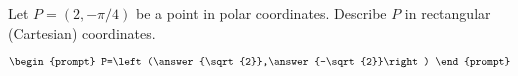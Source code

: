 \documentclass{ximera}
\author{Gregory Hartman \and Matthew Carr}
\begin{document}
\begin{exercise}





Let $P=(2,-\pi/4)$ be a point in polar coordinates. Describe $P$ in rectangular (Cartesian) coordinates.

\[
\begin{prompt}
P=\left(\answer{\sqrt{2}},\answer{-\sqrt{2}}\right)
\end{prompt}
\]

\end{exercise}
\end{document}
